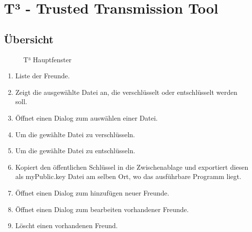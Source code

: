 \documentclass[12pt,a4paper,titlepage]{article}
\begin{document}
\section{T³ - Trusted Transmission Tool}
\subsection{Übersicht}
\begin{figure}[ht]
  \centering
  \caption{T³ Hauptfenster}
  \label{t3_mainwindow}
\end{figure}
\begin{enumerate}
\item Liste der Freunde.
\item Zeigt die ausgewählte Datei an, die verschlüsselt oder entschlüsselt werden soll.
\item Öffnet einen Dialog zum auswählen einer Datei.
\item Um die gewählte Datei zu verschlüsseln.
\item Um die gewählte Datei zu entschlüsseln.
\item Kopiert den öffentlichen Schlüssel in die Zwischenablage und exportiert diesen als myPublic.key Datei am selben Ort, wo das ausführbare Programm liegt.
\item Öffnet einen Dialog zum hinzufügen neuer Freunde.
\item Öffnet einen Dialog zum bearbeiten vorhandener Freunde.
\item Löscht einen vorhandenen Freund.
\end{enumerate}
\end{document}
